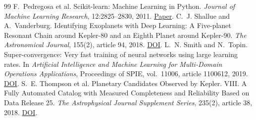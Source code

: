 \documentclass[11pt,a4paper]{article}
\begin{document}
\begin{thebibliography}{99}
 F.~Pedregosa et al. Scikit-learn: Machine Learning in Python. \emph{Journal of Machine Learning Research}, 12:2825--2830, 2011. \href{https://www.jmlr.org/papers/v12/pedregosa11a.html}{Paper}.
 C.~J. Shallue and A.~Vanderburg. Identifying Exoplanets with Deep Learning: A Five-planet Resonant Chain around Kepler-80 and an Eighth Planet around Kepler-90. \emph{The Astronomical Journal}, 155(2), article 94, 2018. \href{https://doi.org/10.3847/1538-3881/aa9e09}{DOI}.
 L.~N. Smith and N.~Topin. Super-convergence: Very fast training of neural networks using large learning rates. In \emph{Artificial Intelligence and Machine Learning for Multi-Domain Operations Applications}, Proceedings of SPIE, vol.~11006, article 1100612, 2019. \href{https://doi.org/10.1117/12.2520589}{DOI}.
 S.~E. Thompson et al. Planetary Candidates Observed by Kepler. VIII. A Fully Automated Catalog with Measured Completeness and Reliability Based on Data Release 25. \emph{The Astrophysical Journal Supplement Series}, 235(2), article 38, 2018. \href{https://doi.org/10.3847/1538-4365/aab4f9}{DOI}.
\end{thebibliography}
\end{document}
